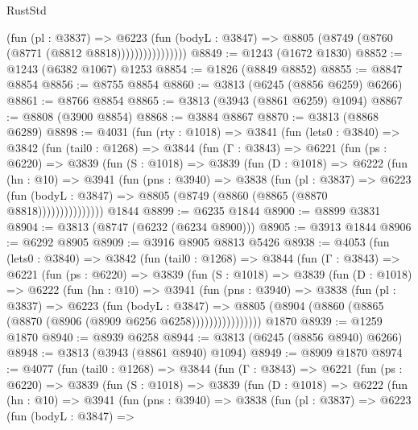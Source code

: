 \begin{lexlean}{RustStd}
\begin{coremodule}
                        (fun (pl : @3837) =>
                        @6223
                          (fun (bodyL : @3847) =>
                          @8805 (@8749 (@8760 (@8771 (@8812 @8818))))))))))))))))
@8849 := @1243 (@1672 @1830)
@8852 := @1243 (@6382 @1067) @1253
@8854 := @1826 (@8849 @8852)
@8855 := @8847 @8854
@8856 := @8755 @8854
@8860 := @3813 (@6245 (@8856 @6259) @6266)
@8861 := @8766 @8854
@8865 := @3813 (@3943 (@8861 @6259) @1094)
@8867 := @8808 (@3900 @8854)
@8868 := @3884 @8867
@8870 := @3813 (@8868 @6289)
@8898 := @4031
    (fun (rty : @1018) =>
    @3841
      (fun (lets0 : @3840) =>
      @3842
        (fun (tail0 : @1268) =>
        @3844
          (fun (Γ : @3843) =>
          @6221
            (fun (ps : @6220) =>
            @3839
              (fun (S : @1018) =>
              @3839
                (fun (D : @1018) =>
                @6222
                  (fun (hn : @10) =>
                  @3941
                    (fun (pns : @3940) =>
                    @3838
                      (fun (pl : @3837) =>
                      @6223
                        (fun (bodyL : @3847) =>
                        @8805 (@8749 (@8860 (@8865 (@8870 @8818)))))))))))))))
    @1844
@8899 := @6235 @1844
@8900 := @8899 @3831
@8904 := @3813 (@8747 (@6232 (@6234 @8900)))
@8905 := @3913 @1844
@8906 := @6292 @8905
@8909 := @3916 @8905 @8813 @5426
@8938 := @4053
    (fun (lets0 : @3840) =>
    @3842
      (fun (tail0 : @1268) =>
      @3844
        (fun (Γ : @3843) =>
        @6221
          (fun (ps : @6220) =>
          @3839
            (fun (S : @1018) =>
            @3839
              (fun (D : @1018) =>
              @6222
                (fun (hn : @10) =>
                @3941
                  (fun (pns : @3940) =>
                  @3838
                    (fun (pl : @3837) =>
                    @6223
                      (fun (bodyL : @3847) =>
                      @8805 (@8904 (@8860 (@8865 (@8870 (@8906 (@8909 @6256 @6258))))))))))))))))
    @1870
@8939 := @1259 @1870
@8940 := @8939 @6258
@8944 := @3813 (@6245 (@8856 @8940) @6266)
@8948 := @3813 (@3943 (@8861 @8940) @1094)
@8949 := @8909 @1870
@8974 := @4077
    (fun (tail0 : @1268) =>
    @3844
      (fun (Γ : @3843) =>
      @6221
        (fun (ps : @6220) =>
        @3839
          (fun (S : @1018) =>
          @3839
            (fun (D : @1018) =>
            @6222
              (fun (hn : @10) =>
              @3941
                (fun (pns : @3940) =>
                @3838
                  (fun (pl : @3837) =>
                  @6223
                    (fun (bodyL : @3847) =>

\end{coremodule}
\end{lexlean}
